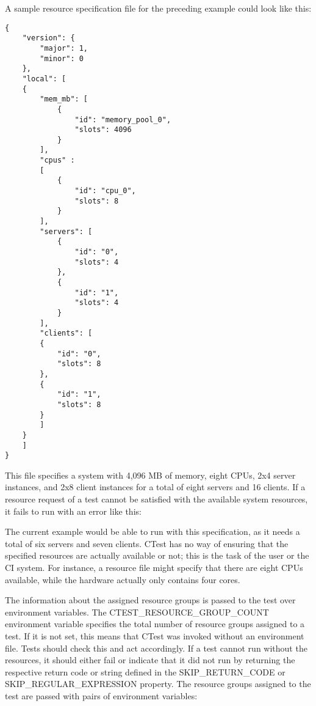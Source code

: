 A sample resource specification file for the preceding example could look like this:

\begin{lstlisting}[style=styleCMake]
{
	"version": {
		"major": 1,
		"minor": 0
	},
	"local": [
	{
		"mem_mb": [
			{
				"id": "memory_pool_0",
				"slots": 4096
			}
		],
		"cpus" :
		[
			{
				"id": "cpu_0",
				"slots": 8
			}
		],	
		"servers": [
			{
				"id": "0",
				"slots": 4
			},
			{
				"id": "1",
				"slots": 4
			}
		],
		"clients": [
		{
			"id": "0",
			"slots": 8
		},
		{
			"id": "1",
			"slots": 8
		}
		]
	}
	]
}
\end{lstlisting}

This file specifies a system with 4,096 MB of memory, eight CPUs, 2x4 server instances, and 2x8 client instances for a total of eight servers and 16 clients. If a resource request of a test cannot be satisfied with the available system resources, it fails to run with an error like this:


The current example would be able to run with this specification, as it needs a total of six servers and seven clients. CTest has no way of ensuring that the specified resources are actually available or not; this is the task of the user or the CI system. For instance, a resource file might specify that there are eight CPUs available, while the hardware actually only contains four cores.

The information about the assigned resource groups is passed to the test over environment variables. The CTEST\_RESOURCE\_GROUP\_COUNT environment variable specifies the total number of resource groups assigned to a test. If it is not set, this means that CTest was invoked without an environment file. Tests should check this and act accordingly. If a test cannot run without the resources, it should either fail or indicate that it did not run by returning the respective return code or string defined in the SKIP\_RETURN\_CODE or SKIP\_REGULAR\_EXPRESSION property. The resource groups assigned to the test are passed with pairs of environment variables:

